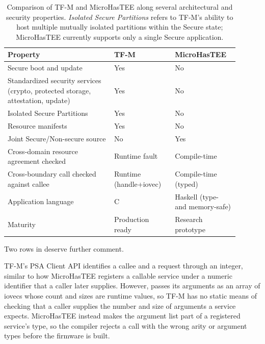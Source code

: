\documentclass[sigconf]{acmart}
\begin{document}
\begin{table}[ht]
  \caption{Comparison of TF-M and MicroHasTEE along several architectural and security properties.
\textit{Isolated Secure Partitions} refers to TF-M's ability to host multiple mutually isolated partitions within the Secure state; MicroHasTEE currently supports only a single Secure application.}
  \label{table:tfm-vs-microhastee}
  \centering
  \small
  \begin{tabular}{@{}p{0.42\linewidth} >{\centering\arraybackslash}p{0.24\linewidth} >{\centering\arraybackslash}p{0.24\linewidth}@{}}
    \toprule
    Property & TF-M & MicroHasTEE \\
    \midrule
    Secure boot and update & Yes & No \\
    Standardized security services (crypto, protected storage, attestation, update) & Yes & No \\
    Isolated Secure Partitions & Yes & No \\
    Resource manifests & Yes & No \\
    Joint Secure/Non-secure source & No & Yes \\
    Cross-domain resource agreement checked & Runtime fault & Compile-time \\
    Cross-boundary call checked against callee & Runtime (handle+iovec) & Compile-time (typed) \\
    Application language & C & Haskell (type- and memory-safe) \\
    Maturity & Production ready & Research prototype \\
    \bottomrule
  \end{tabular}
\end{table}

Two rows in  deserve further comment.

TF-M's PSA Client API identifies a callee and a request through an integer, similar to how MicroHasTEE registers a callable service under a numeric identifier that a caller later supplies.
However,  passes its arguments as an array of iovecs whose count and sizes are runtime values, so TF-M has no static means of checking that a caller supplies the number and size of arguments a service expects.
MicroHasTEE instead makes the argument list part of a registered service's type, so the compiler rejects a call with the wrong arity or argument types before the firmware is built.
\end{document}
